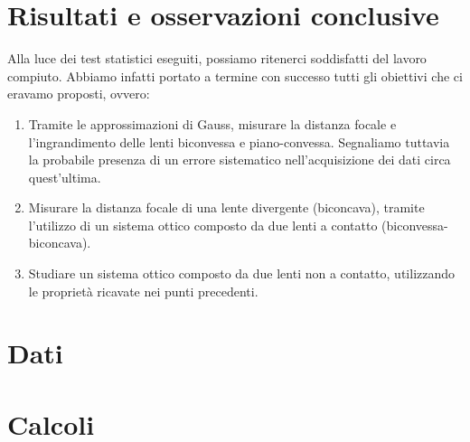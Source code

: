 \documentclass[a4paper]{article}
\begin{document}
\section{Risultati e osservazioni conclusive}
Alla luce dei test statistici eseguiti, possiamo ritenerci soddisfatti del lavoro compiuto. Abbiamo infatti portato a termine con successo tutti gli obiettivi che ci eravamo proposti, ovvero:
\begin{enumerate}
	\item Tramite le approssimazioni di Gauss, misurare la distanza focale e l'ingrandimento delle lenti biconvessa e piano-convessa. Segnaliamo tuttavia la probabile presenza di un errore sistematico nell'acquisizione dei dati circa quest'ultima.
	\item Misurare la distanza focale di una lente divergente (biconcava), tramite l'utilizzo di un sistema ottico composto da due lenti a contatto (biconvessa-biconcava).
	\item Studiare un sistema ottico composto da due lenti non a contatto, utilizzando le proprietà ricavate nei punti precedenti.
\end{enumerate}
\begin{appendices}
    \section{Dati}
    \section{Calcoli}
\end{appendices}
\end{document}
